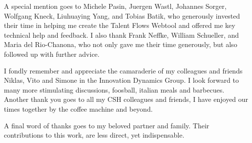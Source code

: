 \documentclass[draft,final]{vutinfth} %
\begin{document}
\begin{acknowledgements*}
A special mention goes to Michele Pasin, Juergen Wastl, Johannes Sorger, Wolfgang Kneck, Liuhuaying Yang, and Tobias Batik, who generously invested their time in helping me create the Talent Flows Webtool and offered me key technical help and feedback. I also thank Frank Neffke, William Schueller, and Maria del Rio-Chanona, who not only gave me their time generously, but also followed up with further advice.

I fondly remember and appreciate the camaraderie of my colleagues and friends Niklas, Vito and Simone in the Innovation Dynamics Group. I look forward to many more stimulating discussions, foosball, italian meals and barbecues. Another thank you goes to all my CSH colleagues and friends, I have enjoyed our times together by the coffee machine and beyond.

A final word of thanks goes to my beloved partner and family. Their contributions to this work, are less direct, yet indispensable.
\end{acknowledgements*}


\begin{kurzfassung}
\end{kurzfassung}
\end{document}
